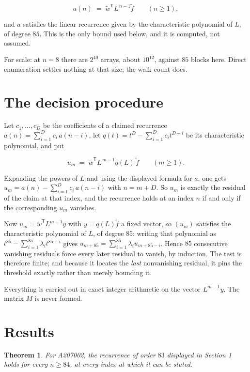 \documentclass[11pt]{article}
\newtheorem{theorem}{Theorem}
\theoremstyle{definition}
\begin{document}
\[a(n) \;=\; \tilde w^{\mathsf T} L^{\,n-1} \tilde f \qquad (n \ge 1),\]

and $a$ satisfies the linear recurrence given by the characteristic polynomial of $L$, of degree $85$. This is the only bound used below, and it is computed, not assumed.

For scale: at $n = 8$ there are $2^{40}$ arrays, about $10^{12}$, against $85$ blocks here. Direct enumeration settles nothing at that size; the walk count does.

\section{The decision procedure}

Let $c_1,\dots,c_D$ be the coefficients of a claimed recurrence $a(n) = \sum_{i=1}^{D} c_i\,a(n-i)$, let $q(t) = t^{D} - \sum_{i=1}^{D} c_i t^{D-i}$ be its characteristic polynomial, and put

\[u_m \;=\; \tilde w^{\mathsf T} L^{\,m-1} q(L)\,\tilde f \qquad (m \ge 1).\]

Expanding the powers of $L$ and using the displayed formula for $a$, one gets $u_m = a(n) - \sum_{i=1}^{D} c_i\,a(n-i)$ with $n = m + D$. So $u_m$ is exactly the residual of the claim at that index, and the recurrence holds at an index $n$ if and only if the corresponding $u_m$ vanishes.

Now $u_m = \tilde w^{\mathsf T} L^{m-1} y$ with $y = q(L)\tilde f$ a fixed vector, so $(u_m)$ satisfies the characteristic polynomial of $L$, of degree $85$: writing that polynomial as $t^{85} - \sum_{i=1}^{85} \lambda_i t^{85-i}$ gives $u_{m+85} = \sum_{i=1}^{85} \lambda_i u_{m+85-i}$. Hence $85$ consecutive vanishing residuals force every later residual to vanish, by induction. The test is therefore finite; and because it locates the {\itshape last} nonvanishing residual, it pins the threshold exactly rather than merely bounding it.

Everything is carried out in exact integer arithmetic on the vector $L^{m-1}y$. The matrix $M$ is never formed.

\section{Results}

\begin{theorem} For A207002, the recurrence of order $83$ displayed in Section 1 holds for every $n \ge 84$, at every index at which it can be stated.\end{theorem}
\end{document}

